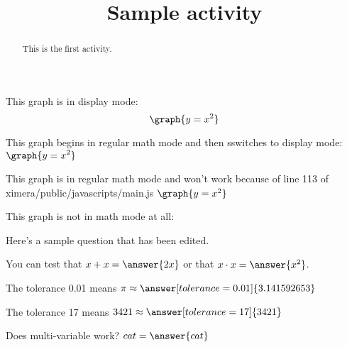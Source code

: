 \documentclass[handout]{ximera}
\title{Sample activity}
\begin{document}
\begin{abstract} This is the first activity.
\end{abstract}


\maketitle


This graph is in display mode:
\[ \graph{y=x^2} \]

This graph begins in regular math mode and then sswitches to display mode:
\( \displaystyle \graph{y=x^2} \)

This graph is in regular math mode and won't work because of line 113 of ximera/public/javascripts/main.js
\( \graph{y=x^2} \)

This graph is not in math mode at all:

Here's a sample question that has been edited. 


\begin{problem}
\begin{multipleChoice}
\end{multipleChoice}
\end{problem}

\begin{problem}
   You can test that $x + x = \answer{2x}$ or that $x \cdot x = \answer{x^2}$.
\end{problem}

\begin{problem}
   The tolerance 0.01 means $\pi \approx \answer[tolerance=0.01]{3.141592653}$
\end{problem}

\begin{problem}
   The tolerance 17 means $3421 \approx \answer[tolerance=17]{3421}$
\end{problem}

\begin{problem}
Does multi-variable work? $ cat = \answer{cat}$
\end{problem}
\end{document}
